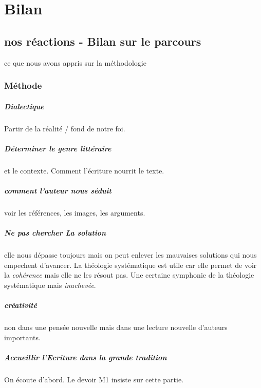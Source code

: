 \chapter{Bilan}


\section{nos réactions - Bilan sur le parcours}
ce que nous avons appris sur la méthodologie


\subsection{Méthode}

\paragraph{Dialectique} Partir de la réalité / fond de notre foi.

\paragraph{Déterminer le genre littéraire} et le contexte. Comment l'écriture nourrit le texte.

\paragraph{comment l'auteur nous séduit} voir les références, les images, les arguments. 

\paragraph{Ne pas chercher La solution} elle nous dépasse toujours mais on peut enlever les mauvaises solutions qui nous empechent d'avancer. La théologie systématique est utile car elle permet de voir la \textit{cohérence} mais elle ne les résout pas. Une certaine symphonie de la théologie systématique mais \textit{inachevée}. 

\paragraph{créativité} non dans une pensée nouvelle mais dans une lecture nouvelle d'auteurs importants.

\paragraph{Accueillir l'Ecriture dans la grande tradition} On écoute d'abord. Le devoir M1 insiste sur cette partie.

